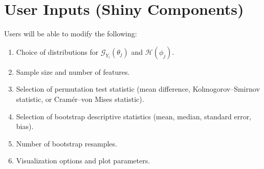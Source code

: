 \documentclass{article}
\begin{document}
\section{User Inputs (Shiny Components)}
Users will be able to modify the following:
\begin{enumerate}[itemsep=0pt, parsep=0pt, topsep=0pt]
    \item Choice of distributions for $\mathcal{G}_{Y_i}(\theta_j)$ and $\mathcal{H}(\phi_j)$.
    \item Sample size and number of features.
    \item Selection of permutation test statistic (mean difference, Kolmogorov–Smirnov statistic, or Cramér–von Mises statistic).
    \item Selection of bootstrap descriptive statistics (mean, median, standard error, bias).
    \item Number of bootstrap resamples.
    \item Visualization options and plot parameters.
\end{enumerate}

\nocite{*}


\vspace{0.8cm}
\end{document}
